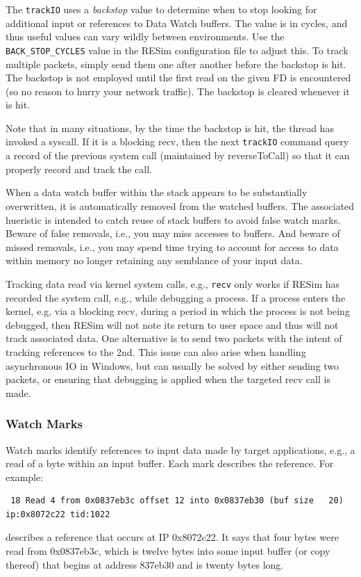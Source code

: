 \documentclass[titlepage]{article}
\begin{document}
The {\tt trackIO} uses a \textit{backstop} value to determine when to stop looking for additional input or references to Data Watch buffers.  The value is in 
cycles, and thus useful values can vary wildly between environments.  Use the {\tt BACK\_STOP\_CYCLES} value in the RESim configuration file to adjust this.
To track multiple packets, simply send them one after another before the backstop is hit.  The backstop is not employed until the first read on the given
FD is encountered (so no reason to hurry your network traffic).  The backstop is cleared whenever it is hit. 

Note that in many situations, by the time the backstop is hit, the thread has invoked a syscall.  If it is a blocking recv, then the next {\tt trackIO} 
command query a record of the previous system call (maintained by reverseToCall) so that it can properly record and track the call.

When a data watch buffer within the stack appears to be substantially overwritten, it is automatically removed from the watched buffers.
The associated hueristic is intended to catch reuse of stack buffers to avoid false watch marks.  Beware of false removals, i.e., you
may miss accesses to buffers.  And beware of missed removals, i.e., you may spend time trying to account for access to data within memory
no longer retaining any semblance of your input data.

Tracking data read via kernel system calls, e.g., {\tt recv} only works if RESim has recorded the system call, e.g., while debugging a process.
If a process enters the kernel, e.g, via a blocking recv, during a period in which the process is not being debugged, then RESim will not note its return
to user space and thus will not track associated data.  One alternative is to send two packets with the intent of tracking references to the 2nd.
This issue can also arise when handling asynchronous IO in Windows, but can usually be solved by either sending two packets, or ensuring that debugging
is applied when the targeted recv call is made.

\subsubsection{Watch Marks}
\label{watch-marks}
Watch marks identify references to input data made by target applications, e.g., a read of a byte within an input buffer.  Each mark describes the reference.  For example:

\begin{verbatim}
 18 Read 4 from 0x0837eb3c offset 12 into 0x0837eb30 (buf size   20)   ip:0x8072c22 tid:1022
\end{verbatim}
\noindent describes a reference that occurs at IP 0x8072c22.  It says that four bytes were read from 0x0837eb3c, which is twelve bytes into some input buffer
(or copy thereof) that begins at address 837eb30 and is twenty bytes long.
\end{document}

